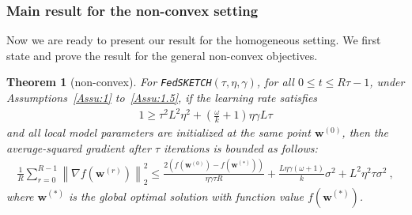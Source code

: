 \documentclass{article} %
\newtheorem{theorem}{Theorem}
\begin{document}
\subsubsection{Main result for the non-convex setting}
Now we are ready to present our result for the homogeneous setting. We first state and prove the result for the general non-convex objectives.  
\begin{theorem}[non-convex]\label{thm:lsgwd-lr} For \texttt{FedSKETCH}$(\tau, \eta, \gamma)$, for all $0\leq t\leq R\tau-1$,  under Assumptions~\ref{Assu:1} to~\ref{Assu:1.5}, if the learning rate satisfies \begin{align}
   1\geq {\tau^2 L^2\eta^2}+\left(\frac{\omega}{k}+1\right){\eta\gamma L}{\tau}
\label{eq:cnd-thm4.3}
\end{align}
and all local model parameters are initialized at the same point ${\boldsymbol{w}}^{(0)}$, then the average-squared gradient after $\tau$ iterations is bounded as follows:
\begin{align}
        \frac{1}{R}\sum_{r=0}^{R-1}\left\|\nabla f({\boldsymbol{w}}^{(r)})\right\|_2^2\leq \frac{2\left(f(\boldsymbol{w}^{(0)})-f(\boldsymbol{w}^{(*)})\right)}{\eta\gamma\tau R}+\frac{L\eta\gamma{\left(\omega+1\right)}}{k}\sigma^2+{L^2\eta^2\tau }\sigma^2 \ , \label{eq:thm1-result} 
\end{align}
where $\boldsymbol{w}^{(*)}$ is the global optimal solution with  function value $f(\boldsymbol{w}^{(*)})$.
\end{theorem}
\end{document}

